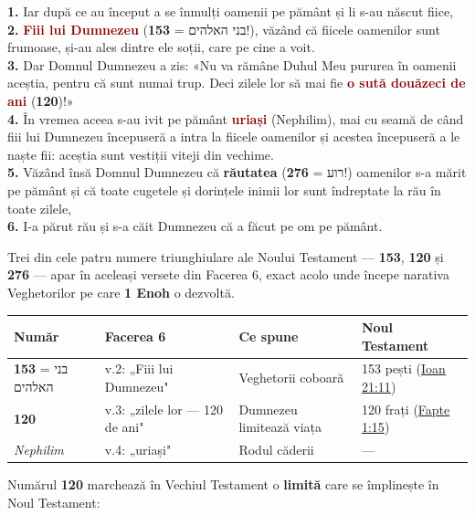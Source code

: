 \documentclass[12pt,a4paper,twoside,openany]{book}
\begin{document}
\begin{biblequote}
\textbf{1.} Iar după ce au început a se înmulți oamenii pe pământ și li s-au născut fiice, \\

\textbf{2.} \textcolor{darkred}{\textbf{Fiii lui Dumnezeu}} (בני האלהים = \textbf{153}!), văzând că fiicele oamenilor sunt frumoase, și-au ales dintre ele soții, care pe cine a voit. \\

\textbf{3.} Dar Domnul Dumnezeu a zis: «Nu va rămâne Duhul Meu pururea în oamenii aceștia, pentru că sunt numai trup. Deci zilele lor să mai fie \textcolor{darkred}{\textbf{o sută douăzeci de ani}} (\textbf{120})!» \\

\textbf{4.} În vremea aceea s-au ivit pe pământ \textcolor{darkred}{\textbf{uriași}} (Nephilim), mai cu seamă de când fiii lui Dumnezeu începuseră a intra la fiicele oamenilor și acestea începuseră a le naște fii: aceștia sunt vestiții viteji din vechime. \\

\textbf{5.} Văzând însă Domnul Dumnezeu că \textbf{răutatea} (רוע = \textbf{276}!) oamenilor s-a mărit pe pământ și că toate cugetele și dorințele inimii lor sunt îndreptate la rău în toate zilele, \\

\textbf{6.} I-a părut rău și s-a căit Dumnezeu că a făcut pe om pe pământ.
\end{biblequote}
Trei din cele patru numere triunghiulare ale Noului Testament — \textbf{153}, \textbf{120} și \textbf{276} — apar în aceleași versete din Facerea 6, exact acolo unde începe narativa Veghetorilor pe care \textbf{1 Enoh} o dezvoltă.

\begin{center}
\small
\begin{tabular}{L{2.4cm}L{4.8cm}L{3.9cm}L{3.5cm}}
\toprule
{}
\textbf{Număr} & \textbf{Facerea 6} & \textbf{Ce spune} & \textbf{Noul Testament} \\
\midrule
\textbf{153} = בני האלהים & v.2: „Fiii lui Dumnezeu" & Veghetorii coboară & 153 pești (\href{https://bibliaortodoxa.ro/carte.php?id=35\&cap=21\#11}{Ioan 21:11}) \\
\textbf{120} & v.3: „zilele lor — 120 de ani" & Dumnezeu limitează viața & 120 frați (\href{https://bibliaortodoxa.ro/carte.php?id=26\&cap=1\#15}{Fapte 1:15}) \\
\textit{Nephilim} & v.4: „uriași" & Rodul căderii & — \\
\bottomrule
\end{tabular}
\end{center}
\normalsize
Numărul \textbf{120} marchează în Vechiul Testament o \textbf{limită} care se împlinește în Noul Testament:
\end{document}
